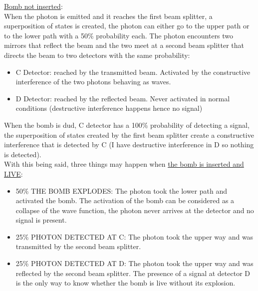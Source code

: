 \ul{Bomb not inserted}:\\
When the photon is emitted and it reaches the first beam splitter, a superposition of states is created, the photon can either go to the upper path or to the lower path with a 50\% probability each. The photon encounters two mirrors that reflect the beam and the two meet at a second beam splitter that directs the beam to two detectors with the same probability:
\begin{itemize}
	\item C Detector: reached by the transmitted beam. Activated by the constructive interference of the two photons behaving as waves.
	\item D Detector: reached by the reflected beam. Never activated in normal conditions (destructive interference happens hence no signal)
	\end{itemize}
When the bomb is dud, C detector has a 100\% probability of detecting a signal, the superposition of states created by the first beam splitter create a constructive interference that is detected by C (I have destructive interference in D so nothing is detected).\\
With this being said, three things may happen when \ul{the bomb is inserted and LIVE}:
\begin{itemize}
	\item 50\% THE BOMB EXPLODES: The photon took the lower path and activated the bomb. The activation of the bomb can be considered as a collapse of the wave function, the photon never arrives at the detector and no signal is present.
	\item 25\% PHOTON DETECTED AT C: The photon took the upper way and was transmitted by the second beam splitter.
	\item 25\% PHOTON DETECTED AT D: The photon took the upper way and was reflected by the second beam splitter. The presence of a signal at detector D is the only way to know whether the bomb is live without its explosion.
	\end{itemize}
